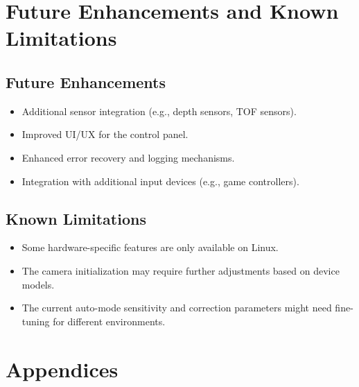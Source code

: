 \documentclass[12pt]{article}
\begin{document}
\section{Future Enhancements and Known Limitations}

\subsection{Future Enhancements}
\begin{itemize}[leftmargin=*, label={--}]
    \item Additional sensor integration (e.g., depth sensors, TOF sensors).
    \item Improved UI/UX for the control panel.
    \item Enhanced error recovery and logging mechanisms.
    \item Integration with additional input devices (e.g., game controllers).
\end{itemize}

\subsection{Known Limitations}
\begin{itemize}[leftmargin=*, label={--}]
    \item Some hardware-specific features are only available on Linux.
    \item The camera initialization may require further adjustments based on device models.
    \item The current auto-mode sensitivity and correction parameters might need fine-tuning for different environments.
\end{itemize}

\section{Appendices}
\end{document}
